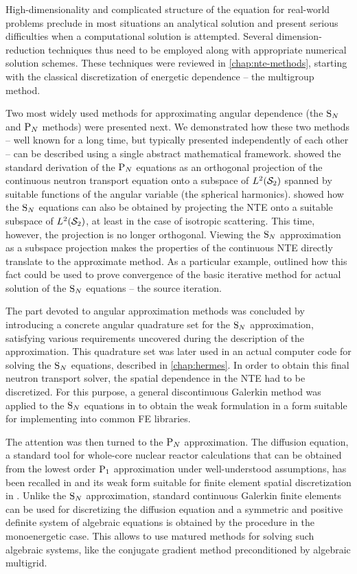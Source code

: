 \documentclass[twoside, 12pt]{thesis}
\begin{document}
High-dimensionality and complicated structure of the equation for real-world problems preclude in most situations an
analytical solution and present serious difficulties when a computational solution is attempted. Several dimension-reduction
techniques thus need to be employed along with appropriate numerical solution schemes. These techniques were reviewed in
\cref{chap:nte-methods}, starting with
the classical discretization of energetic dependence -- the multigroup method. 

Two
most widely used methods for approximating angular dependence (the $\SN$ and $\PN$ methods) were presented next.
 We demonstrated how these two methods -- well known for a long time, but typically presented
independently of each other -- can be described using a single abstract mathematical framework.  showed the standard derivation of the
$\PN$ equations as an orthogonal projection of the continuous neutron transport equation onto a subspace of
$\Lp[2](\Sphere)$ spanned by suitable functions of the angular variable (the spherical harmonics).
 showed how the $\SN$ equations can also be obtained by projecting the NTE onto a suitable
subspace of $\Lp[2](\Sphere)$, at least in the case of isotropic scattering. This time, however, the projection is no
longer orthogonal. Viewing the $\SN$ approximation as a subspace projection makes the properties of the continuous NTE
directly translate to the approximate method. As a particular example,  outlined how this fact could be
used to prove convergence of the basic iterative method for actual solution of the $\SN$ equations --
the source iteration.

The part devoted to angular approximation methods was concluded by introducing a concrete angular quadrature set
for the $\SN$ approximation, satisfying various requirements uncovered during the description of the
approximation. This quadrature set was later used in an actual computer code for solving the $\SN$
equations, described in \cref{chap:hermes}. In order to obtain this final neutron transport solver, the spatial
dependence in the NTE had to be discretized. For this purpose, a general discontinuous Galerkin
method was applied to the $\SN$ equations in  to obtain the weak formulation in a form suitable for
implementing into common FE libraries. 

The attention was then turned to the $\PN$ approximation. The diffusion equation, a standard tool for whole-core nuclear
reactor calculations that can be obtained from the lowest order $\PN[1]$ approximation under well-understood
assumptions, has been recalled in  and its weak form suitable for finite element spatial
discretization in . Unlike the $\SN$ approximation, standard continuous Galerkin finite
elements can be used for discretizing the diffusion equation and a symmetric and positive definite system of algebraic
equations is obtained by the procedure in the monoenergetic case. This allows to use matured methods for solving
such algebraic systems, like the conjugate gradient method preconditioned by algebraic multigrid.
\end{document}
